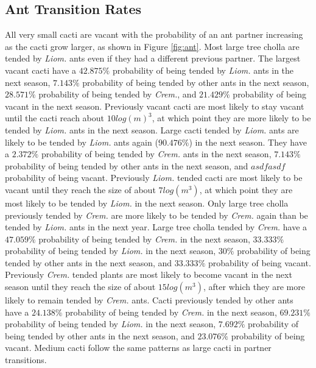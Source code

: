 \documentclass[12pt,a4paper]{article}
\begin{document}
		\subsection*{Ant Transition Rates}
		All very small cacti are vacant with the probability of an ant partner increasing as the cacti grow larger, as shown in Figure \ref{fig:ant}. 
		Most large tree cholla are tended by \textit{Liom.} ants even if they had a different previous partner.
		The largest vacant cacti have a $42.875\%$ probability of being tended by \textit{Liom.} ants in the next season, $7.143\%$ probability of being tended by other ants in the next season, $28.571\%$ probability of being tended by \textit{Crem.}, and $21.429\%$ probability of being vacant in the next season.
		Previously vacant cacti are most likely to stay vacant until the cacti reach about $10 log(m)^3$, at which point they are more likely to be tended by \textit{Liom.} ants in the next season. 
		Large cacti tended by \textit{Liom.} ants are likely to be tended by \textit{Liom.} ants again ($90.476\%$) in the next season.
		They have a $2.372\%$ probability of being tended by \textit{Crem.} ants in the next season, $7.143\%$ probability of being tended by other ants in the next season, and $asdfasdf$ probability of being vacant.  
		Previously \textit{Liom.} tended cacti are most likely to be vacant until they reach the size of about $7 log(m^3)$, at which point they are most likely to be tended by \textit{Liom.} in the next season.
		Only large tree cholla previously tended by \textit{Crem.} are more likely to be tended by \textit{Crem.} again than be tended by \textit{Liom.} ants in the next year. 
		Large tree cholla tended by \textit{Crem.} have a $47.059\%$ probability of being tended by \textit{Crem.} in the next season, $33.333\%$ probability of being tended by \textit{Liom.} in the next season, $30\%$ probability of being tended by other ants in the next season, and $33.333\%$ probability of being vacant. 
		Previously \textit{Crem.} tended plants are most likely to become vacant in the next season until they reach the size of about $15 log(m^3)$, after which they are more likely to remain tended by \textit{Crem.} ants. 
		Cacti previously tended by other ants have a $24.138\%$ probability of being tended by \textit{Crem.} in the next season, $69.231\%$ probability of being tended by \textit{Liom.} in the next season, $7.692\%$ probability of being tended by other ants in the next season, and $23.076\%$ probability of being vacant. 
		Medium cacti follow the same patterns as large cacti in partner transitions. 
		
\end{document}
